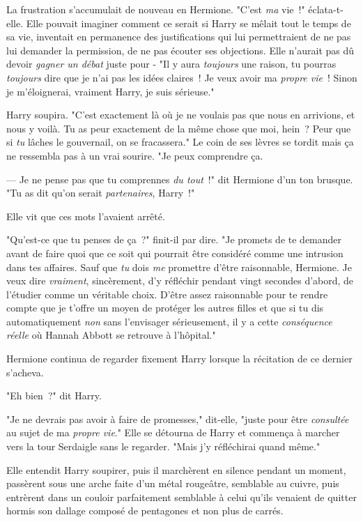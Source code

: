 La frustration s'accumulait de nouveau en Hermione. "C'est \emph{ma} vie~!" éclata-t-elle. Elle pouvait imaginer comment ce serait si Harry se mêlait tout le temps de sa vie, inventait en permanence des justifications qui lui permettraient de ne pas lui demander la permission, de ne pas écouter ses objections. Elle n'aurait pas dû devoir \emph{gagner un débat} juste pour - "Il y aura \emph{toujours} une raison, tu pourras \emph{toujours} dire que je n'ai pas les idées claires~! Je veux avoir ma \emph{propre vie}~! Sinon je m'éloignerai, vraiment Harry, je suis sérieuse."

Harry soupira. "C'est exactement là où je ne voulais pas que nous en arrivions, et nous y voilà. Tu as peur exactement de la même chose que moi, hein~? Peur que si \emph{tu} lâches le gouvernail, on se fracassera." Le coin de ses lèvres se tordit mais ça ne ressembla pas à un vrai sourire. "Je peux comprendre ça.

--- Je ne pense pas que tu comprennes \emph{du tout}~!" dit Hermione d'un ton brusque. "Tu as dit qu'on serait \emph{partenaires}, Harry~!"

Elle vit que ces mots l'avaient arrêté.

"Qu'est-ce que tu penses de ça~?" finit-il par dire. "Je promets de te demander avant de faire quoi que ce soit qui pourrait être considéré comme une intrusion dans tes affaires. Sauf que \emph{tu} dois \emph{me} promettre d'être raisonnable, Hermione. Je veux dire \emph{vraiment}, sincèrement, d'y réfléchir pendant vingt secondes d'abord, de l'étudier comme un véritable choix. D'être assez raisonnable pour te rendre compte que je t'offre un moyen de protéger les autres filles et que si tu dis automatiquement \emph{non} sans l'envisager sérieusement, il y a cette \emph{conséquence réelle} où Hannah Abbott se retrouve à l'hôpital."

Hermione continua de regarder fixement Harry lorsque la récitation de ce dernier s'acheva.

"Eh bien~?" dit Harry.

"Je ne devrais pas avoir à faire de promesses," dit-elle, "juste pour être \emph{consultée} au sujet de ma \emph{propre vie}." Elle se détourna de Harry et commença à marcher vers la tour Serdaigle sans le regarder. "Mais j'y réfléchirai quand même."

Elle entendit Harry soupirer, puis il marchèrent en silence pendant un moment, passèrent sous une arche faite d'un métal rougeâtre, semblable au cuivre, puis entrèrent dans un couloir parfaitement semblable à celui qu'ils venaient de quitter hormis son dallage composé de pentagones et non plus de carrés.

